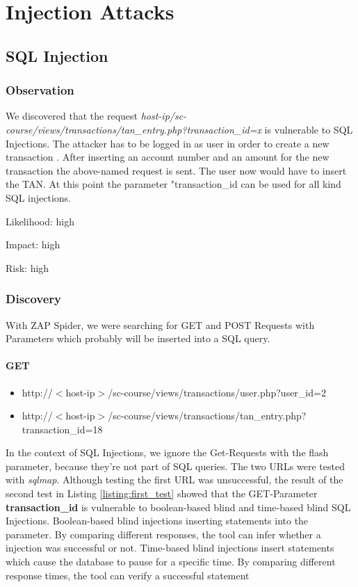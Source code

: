 
\chapter{Injection Attacks}

\section{SQL Injection}
\label{chapter:sql_injection}

\subsection{Observation}

We discovered that the request \textit{host-ip/sc-course/views/transactions/tan\_entry.php?transaction\_id=x} is vulnerable to SQL Injections.
The attacker has to be logged in as user in order to create a new transaction . After inserting an account number and an amount for the new transaction the above-named request is sent. The user now would have to insert the TAN. At this point the parameter "transaction\_id can be used for all kind SQL injections.


Likelihood: high\newline

Impact:      	high\newline

Risk: high \newline

\subsection{Discovery}
With ZAP Spider, we were searching for GET and POST Requests with Parameters which probably will be inserted into a SQL query.

\subsubsection{GET}
\begin{itemize}
	\item http://$<$host-ip$>$/sc-course/views/transactions/user.php?user\_id=2 
	\item http://$<$host-ip$>$/sc-course/views/transactions/tan\_entry.php?transaction\_id=18
	
\end{itemize}
 In the context of SQL Injections, we ignore the Get-Requests with the flash parameter, because they're not part of SQL queries.
 The two URLs were tested with \textit{sqlmap}. Although testing the first URL was unsuccessful, the result of the second test in Listing \ref{listing:first_test} showed that the GET-Parameter\textbf{ transaction\_id} is vulnerable to boolean-based blind and time-based blind SQL Injections. Boolean-based blind injections inserting statements into the parameter. By comparing different responses, the tool can infer whether a injection was successful or not.
 Time-based blind injections insert statements which cause the database to pause for a specific time. By comparing different response times, the tool can verify a successful statement
 



